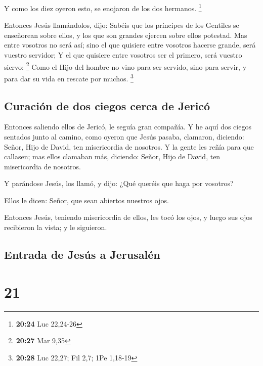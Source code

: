  Y como los diez oyeron esto, se enojaron de los dos
hermanos. \footnote{\textbf{20:24} Luc 22,24-26}

 Entonces Jesús llamándolos, dijo: Sabéis que los
príncipes de los Gentiles se enseñorean sobre ellos, y los que son
grandes ejercen sobre ellos potestad.  Mas entre vosotros
no será así; sino el que quisiere entre vosotros hacerse grande, será
vuestro servidor;  Y el que quisiere entre vosotros ser
el primero, será vuestro siervo: \footnote{\textbf{20:27} Mar 9,35}
 Como el Hijo del hombre no vino para ser servido, sino
para servir, y para dar su vida en rescate por muchos. \footnote{\textbf{20:28}
  Luc 22,27; Fil 2,7; 1Pe 1,18-19}

\hypertarget{curaciuxf3n-de-dos-ciegos-cerca-de-jericuxf3}{%
\subsection{Curación de dos ciegos cerca de
Jericó}\label{curaciuxf3n-de-dos-ciegos-cerca-de-jericuxf3}}

 Entonces saliendo ellos de Jericó, le seguía gran
compañía.  Y he aquí dos ciegos sentados junto al camino,
como oyeron que Jesús pasaba, clamaron, diciendo: Señor, Hijo de David,
ten misericordia de nosotros.  Y la gente les reñía para
que callasen; mas ellos clamaban más, diciendo: Señor, Hijo de David,
ten misericordia de nosotros.

 Y parándose Jesús, los llamó, y dijo: ¿Qué queréis que
haga por vosotros?

 Ellos le dicen: Señor, que sean abiertos nuestros ojos.

 Entonces Jesús, teniendo misericordia de ellos, les tocó
los ojos, y luego sus ojos recibieron la vista; y le siguieron.

\hypertarget{entrada-de-jesuxfas-a-jerusaluxe9n}{%
\subsection{Entrada de Jesús a
Jerusalén}\label{entrada-de-jesuxfas-a-jerusaluxe9n}}

\hypertarget{section-20}{%
\section{21}\label{section-20}}

